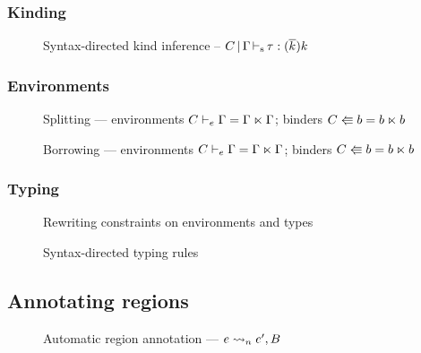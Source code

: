 
\subsubsection{Kinding}


\begin{figure}[ht]
  \centering
  
  \caption{Syntax-directed kind inference --
    $C \operatorname{|} \Gamma \operatorname{\vdash_s} \tau : (\overline{k_{{}}})k$}
  \label{rules:sd-kinding}
\end{figure}

\subsubsection{Environments}


\begin{figure}[tp]
  
  \caption{Splitting --- environments $C \vdash_e \Gamma = \Gamma \ltimes \Gamma$; binders $C \Lleftarrow b = b \ltimes b$}
  \label{fig:sd-splitting}
\end{figure}

\begin{figure}[tp]
  
  \caption{Borrowing --- environments $C \vdash_e \Gamma = \Gamma \ltimes \Gamma$; binders $C \Lleftarrow b = b \ltimes b$}
  \label{fig:sd-borrowing}
\end{figure}

\subsubsection{Typing}

\begin{figure*}[tp]
  
  \caption{Rewriting constraints on environments and types}
  \label{fig:contraints-environments-types}
\end{figure*}
\begin{figure*}[tp]
  
  \caption{Syntax-directed typing rules}
  \label{fig:syntax-directed-typing}
\end{figure*}

\clearpage

\subsection{Annotating regions}
\label{regionannot}

\begin{figure*}[htp]
  \centering
  
  \caption{Automatic region annotation --- $e \rightsquigarrow_{n} e', B$}
  \label{fig:region-annotation}
\end{figure*}

